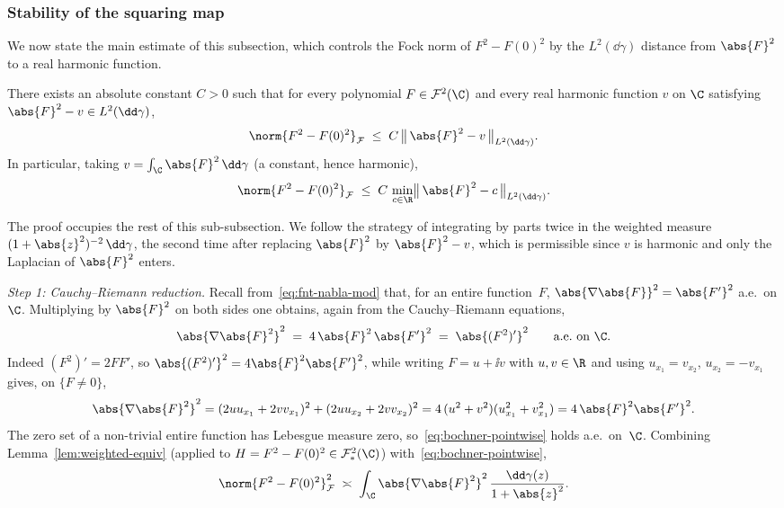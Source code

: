 \subsubsection{Stability of the squaring map}\label{sec:squaring}

We now state the main estimate of this subsection, which controls the
Fock norm of $F^2 - F(0)^2$ by the $L^2(\dd\gamma)$ distance from
$\abs{F}^2$ to a real harmonic function.

\begin{theorem}\label{thm:squaring}
There exists an absolute constant $C > 0$ such that for every polynomial
$F \in \mathcal{F}^2(\C)$ and every real harmonic function $v$ on $\C$
satisfying $\abs{F}^2 - v \in L^2(\dd\gamma)$,
\[
\norm{F^2 - F(0)^2}_{\mathcal{F}}
\;\le\;
C\, \bigl\|\, \abs{F}^2 - v \,\bigr\|_{L^2(\dd\gamma)}.
\]
In particular, taking $v = \int_{\C}\abs{F}^2\,\dd\gamma$ (a constant, hence
harmonic),
\begin{equation}\label{eq:squaring-min}
\norm{F^2 - F(0)^2}_{\mathcal{F}}
\;\le\;
C\, \min_{c \in \R}\bigl\|\, \abs{F}^2 - c \,\bigr\|_{L^2(\dd\gamma)}.
\end{equation}
\end{theorem}

The proof occupies the rest of this sub-subsection. We follow the strategy
of integrating by parts twice in the weighted measure
$(1+\abs{z}^2)^{-2}\,\dd\gamma$, the second time after replacing $\abs{F}^2$
by $\abs{F}^2 - v$, which is permissible since $v$ is harmonic and only
the Laplacian of $\abs{F}^2$ enters.

\medskip
\noindent\emph{Step 1: Cauchy--Riemann reduction.}\;
Recall from~\eqref{eq:fnt-nabla-mod} that, for an entire function~$F$,
$\abs{\nabla \abs{F}}^2 = \abs{F'}^2$ a.e.\ on $\C$. Multiplying by
$\abs{F}^2$ on both sides one obtains, again from the Cauchy--Riemann
equations,
\begin{equation}\label{eq:bochner-pointwise}
\abs{\nabla \abs{F}^2}^2
\;=\;
4\, \abs{F}^2\, \abs{F'}^2
\;=\;
\abs{(F^2)'}^2
\qquad\text{a.e.\ on } \C.
\end{equation}
Indeed $(F^2)' = 2F F'$, so $\abs{(F^2)'}^2 = 4\abs{F}^2 \abs{F'}^2$, while
writing $F = u + \ii v$ with $u,v \in \R$ and using
$u_{x_1} = v_{x_2}$, $u_{x_2} = -v_{x_1}$ gives, on $\{F \neq 0\}$,
\[
\abs{\nabla \abs{F}^2}^2
= (2 u u_{x_1} + 2 v v_{x_1})^2
+ (2 u u_{x_2} + 2 v v_{x_2})^2
= 4\,(u^2+v^2)(u_{x_1}^2 + v_{x_1}^2)
= 4\,\abs{F}^2 \abs{F'}^2.
\]
The zero set of a non-trivial entire function has Lebesgue measure zero,
so~\eqref{eq:bochner-pointwise} holds a.e.\ on~$\C$. Combining
Lemma~\ref{lem:weighted-equiv} (applied to $H = F^2 - F(0)^2 \in
\mathcal{F}^2_\ast(\C)$) with~\eqref{eq:bochner-pointwise},
\begin{equation}\label{eq:squaring-step1}
\norm{F^2 - F(0)^2}_{\mathcal{F}}^2
\;\asymp\;
\int_{\C} \abs{\nabla \abs{F}^2}^2\, \frac{\dd\gamma(z)}{1+\abs{z}^2}.
\end{equation}

